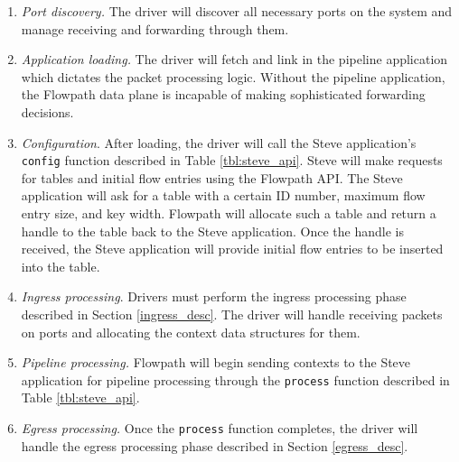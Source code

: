 \begin{enumerate}
\item \textit{Port discovery.} The driver will discover all necessary ports on the system and manage receiving and forwarding through them.

\item \textit{Application loading.} The driver will fetch and link in the pipeline application which dictates the packet processing logic. Without the pipeline application, the Flowpath data plane is incapable of making sophisticated forwarding decisions.

\item \textit{Configuration}. After loading, the driver will call the Steve application's \texttt{config} function described in Table \ref{tbl:steve_api}. Steve will make requests for tables and initial flow entries using the Flowpath API. The Steve application will ask for a table with a certain ID number, maximum flow entry size, and key width. Flowpath will allocate such a table and return a handle to the table back to the Steve application. Once the handle is received, the Steve application will provide initial flow entries to be inserted into the table.

\item \textit{Ingress processing}. Drivers must perform the ingress processing phase described in Section \ref{ingress_desc}. The driver will handle receiving packets on ports and allocating the context data structures for them.

\item \textit{Pipeline processing.} Flowpath will begin sending contexts to the Steve application for pipeline processing through the \texttt{process} function described in Table \ref{tbl:steve_api}.

\item \textit{Egress processing.} Once the \texttt{process} function completes, the driver will handle the egress processing phase described in Section \ref{egress_desc}.
\end{enumerate}